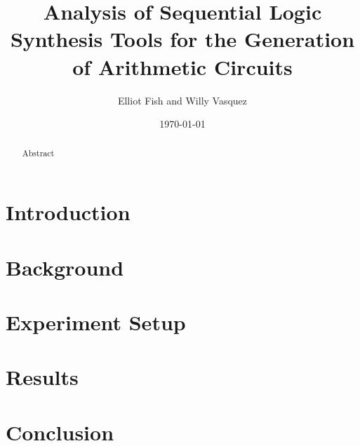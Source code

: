 \documentclass[a4paper]{article}
\title{Analysis of Sequential Logic Synthesis Tools for the Generation of Arithmetic Circuits}
\author{Elliot Fish and Willy Vasquez}
\date{\today}
\begin{document}
\maketitle

\begin{abstract}
Abstract
\end{abstract}

\section{Introduction}
\label{sec:introduction}


\section{Background}
\label{sec:theory}


\section{Experiment Setup}
\label{sec:experiment}

\section{Results}
\label{sec:results}

\section{Conclusion}
\label{sec:conclusion}

\begin{thebibliography}{9}

\end{thebibliography}
\end{document}
